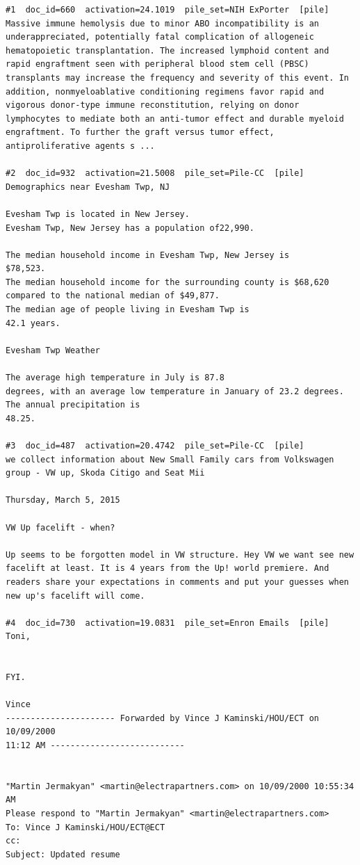 \begin{verbatim}
#1  doc_id=660  activation=24.1019  pile_set=NIH ExPorter  [pile]
Massive immune hemolysis due to minor ABO incompatibility is an underappreciated, potentially fatal complication of allogeneic hematopoietic transplantation. The increased lymphoid content and rapid engraftment seen with peripheral blood stem cell (PBSC) transplants may increase the frequency and severity of this event. In addition, nonmyeloablative conditioning regimens favor rapid and vigorous donor-type immune reconstitution, relying on donor lymphocytes to mediate both an anti-tumor effect and durable myeloid engraftment. To further the graft versus tumor effect, antiproliferative agents s ...

#2  doc_id=932  activation=21.5008  pile_set=Pile-CC  [pile]
Demographics near Evesham Twp, NJ

Evesham Twp is located in New Jersey.
Evesham Twp, New Jersey has a population of22,990.

The median household income in Evesham Twp, New Jersey is
$78,523.
The median household income for the surrounding county is $68,620
compared to the national median of $49,877.
The median age of people living in Evesham Twp is
42.1 years.

Evesham Twp Weather

The average high temperature in July is 87.8
degrees, with an average low temperature in January of 23.2 degrees.
The annual precipitation is
48.25.

#3  doc_id=487  activation=20.4742  pile_set=Pile-CC  [pile]
we collect information about New Small Family cars from Volkswagen group - VW up, Skoda Citigo and Seat Mii

Thursday, March 5, 2015

VW Up facelift - when?

Up seems to be forgotten model in VW structure. Hey VW we want see new facelift at least. It is 4 years from the Up! world premiere. And readers share your expectations in comments and put your guesses when new up's facelift will come.

#4  doc_id=730  activation=19.0831  pile_set=Enron Emails  [pile]
Toni,


FYI.

Vince
---------------------- Forwarded by Vince J Kaminski/HOU/ECT on 10/09/2000 
11:12 AM ---------------------------


"Martin Jermakyan" <martin@electrapartners.com> on 10/09/2000 10:55:34 AM
Please respond to "Martin Jermakyan" <martin@electrapartners.com>
To: Vince J Kaminski/HOU/ECT@ECT
cc:  
Subject: Updated resume




\end{verbatim}
